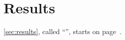 \section{Results}\label{sec:results}
\autoref{sec:results}, called ``'',
starts on page~\pageref{sec:results}.
